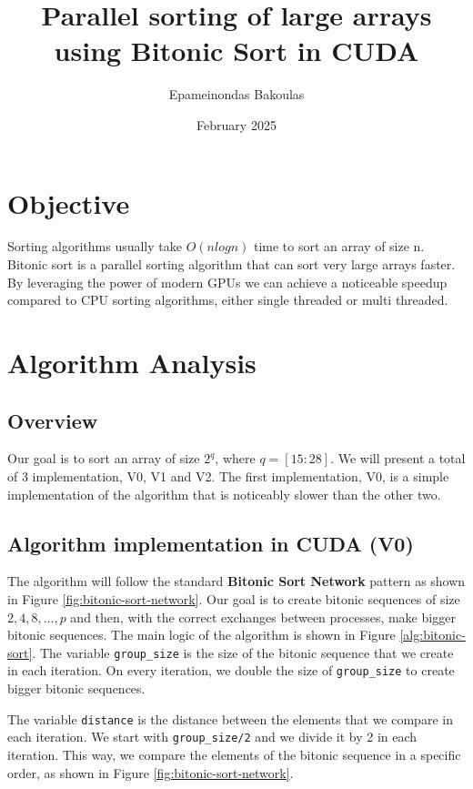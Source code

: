 \documentclass{article}
\title{Parallel sorting of large arrays using Bitonic Sort in CUDA}
\author{Epameinondas Bakoulas}
\date{February 2025}
\begin{document}
\maketitle

\section{Objective}
Sorting algorithms usually take $O(nlogn)$ time to sort an array of size n. Bitonic sort is a parallel sorting 
algorithm that can sort very large arrays faster. By leveraging the power of modern GPUs we can achieve a noticeable
speedup compared to CPU sorting algorithms, either single threaded or multi threaded.

\section{Algorithm Analysis}

\subsection{Overview}

Our goal is to sort an array of size $2^q$, where $q = [15:28]$. We will present a total of 3 implementation, V0, V1 and V2.
The first implementation, V0, is a simple implementation of the algorithm that is noticeably slower than the other two.

\subsection{Algorithm implementation in CUDA (V0)}

The algorithm will follow the standard \textbf{Bitonic Sort Network} pattern as shown in Figure \ref{fig:bitonic-sort-network}.
Our goal is to create bitonic sequences of size $2, 4, 8, ..., p$ and then, with the correct exchanges between
processes, make bigger bitonic sequences. 
The main logic of the algorithm is shown in Figure \ref{alg:bitonic-sort}.
The variable \texttt{group\_size} is the size of the bitonic sequence that we
create in each iteration. On every iteration, we double the size of \texttt{group\_size} to create bigger bitonic sequences.

The variable \texttt{distance} is the distance between the elements that we compare in each iteration. We start with
\texttt{group\_size/2} and we divide it by 2 in each iteration. This way, we compare the elements of the bitonic sequence
in a specific order, as shown in Figure \ref{fig:bitonic-sort-network}.
\end{document}
